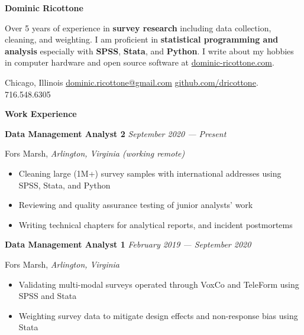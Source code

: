 \documentclass[12pt]{article}
\begin{document}
\centering
{\textbf{\Huge Dominic Ricottone}}



\raggedright
\vspace{.5em}
Over 5 years of experience in \textbf{survey research}
including data collection, cleaning, and weighting.
I am proficient in \textbf{statistical programming and analysis} especially with
\textbf{SPSS}, \textbf{Stata}, and \textbf{Python}.
I write about my hobbies in computer hardware and open source software at
\href{https://www.dominic-ricottone.com}{dominic-ricottone.com}.



\centering
\vspace{.5em}
 Chicago, Illinois
\enspace
{} \href{mailto:dominic.ricottone@gmail.com}{dominic.ricottone@gmail.com}
\enspace
{} \href{https://github.com/dricottone}{github.com/dricottone}.
\enspace
{} 716.548.6305



\raggedright
\vspace{.75em}
\textbf{\Large Work Experience} \hrulefill
\vspace{.5em}

\textbf{Data Management Analyst 2} \hfill \textit{September 2020 --- Present}
\par Fors Marsh, \textit{Arlington, Virginia (working remote)}
\begin{itemize}[]
\item Cleaning large (1M+) survey samples with international addresses using SPSS, Stata, and Python
\item Reviewing and quality assurance testing of junior analysts' work
\item Writing technical chapters for analytical reports, and incident postmortems
\end{itemize}

\par \textbf{Data Management Analyst 1} \hfill \textit{February 2019 --- September 2020}
\par Fors Marsh, \textit{Arlington, Virginia}
\begin{itemize}[]
\item Validating multi-modal surveys operated through VoxCo and TeleForm using SPSS and Stata
\item Weighting survey data to mitigate design effects and non-response bias using Stata
\end{itemize}
\end{document}
